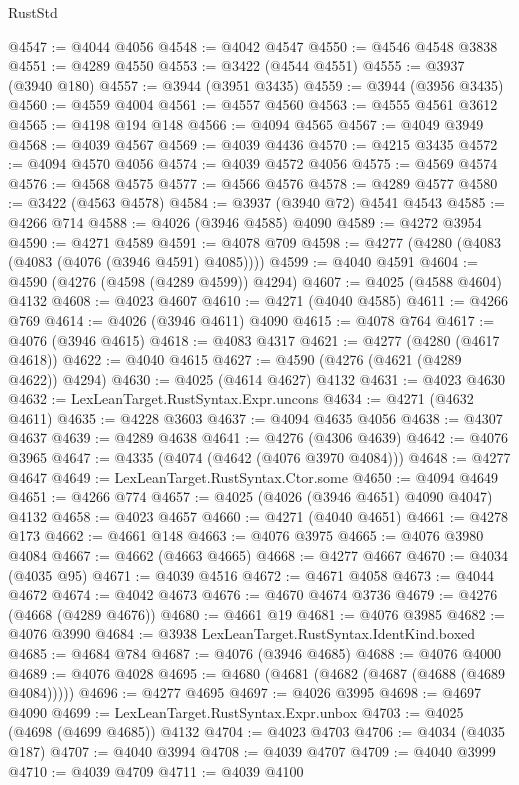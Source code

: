 \begin{lexlean}{RustStd}
\begin{coremodule}
@4547 := @4044 @4056
@4548 := @4042 @4547
@4550 := @4546 @4548 @3838
@4551 := @4289 @4550
@4553 := @3422 (@4544 @4551)
@4555 := @3937 (@3940 @180)
@4557 := @3944 (@3951 @3435)
@4559 := @3944 (@3956 @3435)
@4560 := @4559 @4004
@4561 := @4557 @4560
@4563 := @4555 @4561 @3612
@4565 := @4198 @194 @148
@4566 := @4094 @4565
@4567 := @4049 @3949
@4568 := @4039 @4567
@4569 := @4039 @4436
@4570 := @4215 @3435
@4572 := @4094 @4570 @4056
@4574 := @4039 @4572 @4056
@4575 := @4569 @4574
@4576 := @4568 @4575
@4577 := @4566 @4576
@4578 := @4289 @4577
@4580 := @3422 (@4563 @4578)
@4584 := @3937 (@3940 @72) @4541 @4543
@4585 := @4266 @714
@4588 := @4026 (@3946 @4585) @4090
@4589 := @4272 @3954
@4590 := @4271 @4589
@4591 := @4078 @709
@4598 := @4277 (@4280 (@4083 (@4083 (@4076 (@3946 @4591) @4085))))
@4599 := @4040 @4591
@4604 := @4590 (@4276 (@4598 (@4289 @4599)) @4294)
@4607 := @4025 (@4588 @4604) @4132
@4608 := @4023 @4607
@4610 := @4271 (@4040 @4585)
@4611 := @4266 @769
@4614 := @4026 (@3946 @4611) @4090
@4615 := @4078 @764
@4617 := @4076 (@3946 @4615)
@4618 := @4083 @4317
@4621 := @4277 (@4280 (@4617 @4618))
@4622 := @4040 @4615
@4627 := @4590 (@4276 (@4621 (@4289 @4622)) @4294)
@4630 := @4025 (@4614 @4627) @4132
@4631 := @4023 @4630
@4632 := LexLeanTarget.RustSyntax.Expr.uncons
@4634 := @4271 (@4632 @4611)
@4635 := @4228 @3603
@4637 := @4094 @4635 @4056
@4638 := @4307 @4637
@4639 := @4289 @4638
@4641 := @4276 (@4306 @4639)
@4642 := @4076 @3965
@4647 := @4335 (@4074 (@4642 (@4076 @3970 @4084)))
@4648 := @4277 @4647
@4649 := LexLeanTarget.RustSyntax.Ctor.some
@4650 := @4094 @4649
@4651 := @4266 @774
@4657 := @4025 (@4026 (@3946 @4651) @4090 @4047) @4132
@4658 := @4023 @4657
@4660 := @4271 (@4040 @4651)
@4661 := @4278 @173
@4662 := @4661 @148
@4663 := @4076 @3975
@4665 := @4076 @3980 @4084
@4667 := @4662 (@4663 @4665)
@4668 := @4277 @4667
@4670 := @4034 (@4035 @95)
@4671 := @4039 @4516
@4672 := @4671 @4058
@4673 := @4044 @4672
@4674 := @4042 @4673
@4676 := @4670 @4674 @3736
@4679 := @4276 (@4668 (@4289 @4676))
@4680 := @4661 @19
@4681 := @4076 @3985
@4682 := @4076 @3990
@4684 := @3938 LexLeanTarget.RustSyntax.IdentKind.boxed
@4685 := @4684 @784
@4687 := @4076 (@3946 @4685)
@4688 := @4076 @4000
@4689 := @4076 @4028
@4695 := @4680 (@4681 (@4682 (@4687 (@4688 (@4689 @4084)))))
@4696 := @4277 @4695
@4697 := @4026 @3995
@4698 := @4697 @4090
@4699 := LexLeanTarget.RustSyntax.Expr.unbox
@4703 := @4025 (@4698 (@4699 @4685)) @4132
@4704 := @4023 @4703
@4706 := @4034 (@4035 @187)
@4707 := @4040 @3994
@4708 := @4039 @4707
@4709 := @4040 @3999
@4710 := @4039 @4709
@4711 := @4039 @4100

\end{coremodule}
\end{lexlean}
